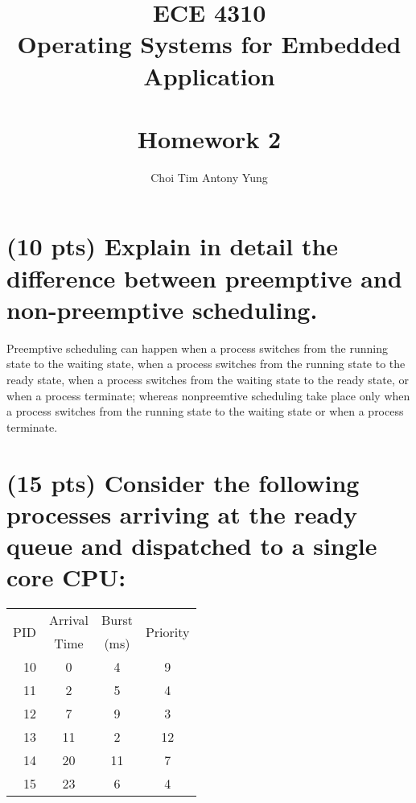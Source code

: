 \documentclass{article}
\title{ECE 4310\\Operating Systems for Embedded Application\\\,\\Homework 2}
\author{Choi Tim Antony Yung}
\begin{document}
\maketitle

\thispagestyle{empty}
\setcounter{page}{0}

\newpage



\section{(10 pts) Explain in detail the difference between preemptive and non-preemptive scheduling.}
Preemptive scheduling can happen when a process switches from the running state to the waiting state,
when a process switches from the running state to the ready state, when a process switches from the waiting state to the ready state,
or when a process terminate; whereas nonpreemtive scheduling take place only when a process switches from the running state to the waiting state or when a process terminate.

\section{(15 pts) Consider the following processes arriving at the ready queue and dispatched to a single core CPU:}

\begin{table}[H]
  \centering
  \begin{tabular}{r|ccc}
    \toprule
    \multirow{2}{*}{PID} & Arrival & Burst & \multirow{2}{*}{Priority} \\
                         & Time    & (ms)  &                           \\
    \midrule
    10                   & 0       & 4     & 9                         \\
    11                   & 2       & 5     & 4                         \\
    12                   & 7       & 9     & 3                         \\
    13                   & 11      & 2     & 12                        \\
    14                   & 20      & 11    & 7                         \\
    15                   & 23      & 6     & 4                         \\
    \bottomrule
  \end{tabular}
\end{table}
\end{document}
